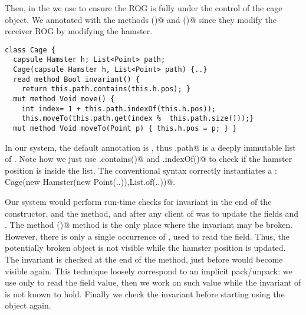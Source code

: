 Then, in the \Q@Cage@
we use \Q@capsule@ to ensure
the \Q@Hamster@ ROG is fully under the control
of the cage object.
We annotated with \Q@mut@ the methods \Q@move()@
and \Q@moveTo()@ since they modify
the receiver ROG by modifying the hamster.
\begin{lstlisting}
class Cage {
  capsule Hamster h; List<Point> path;
  Cage(capsule Hamster h, List<Point> path) {..}
  read method Bool invariant() {
    return this.path.contains(this.h.pos); }
  mut method Void move() {
    int index= 1 + this.path.indexOf(this.h.pos));
    this.moveTo(this.path.get(index %  this.path.size()));}
  mut method Void moveTo(Point p) { this.h.pos = p; } }
\end{lstlisting}
In our system, the default annotation is \Q@immutable@, thus \Q@Cage.path@ is a deeply immutable list of \Q@Point@s.
Note how we just use \Q@List.contains()@ and \Q@List.indexOf()@
to check if the hamster position is inside the list.
The conventional syntax correctly instantiates a \Q@Cage@:
\Q@new Cage(new Hamster(new Point(..)),List.of(..))@.

Our system would perform run-time checks for invariant
in the end of the constructor, and the \Q@moveTo@
method, and after any client of \Q@Cage@
was to update the fields \Q@h@ and \Q@path@.
The method \Q@moveTo()@ method is the only place where the invariant may be broken. However, there is only a single occurrence of \Q@this@, used to read the \Q@h@ field. Thus, the potentially broken \Q@this@ object is not visible while the hamster position is updated. The invariant is checked at the end of the method, just before \Q@this@ would become visible again.
This technique loosely correspond to an implicit pack/unpack: we use \Q@this@ only to read the field value, then we work on such value while the invariant of \Q@this@ is not known to hold. Finally we 
check the invariant before starting using the object again.

